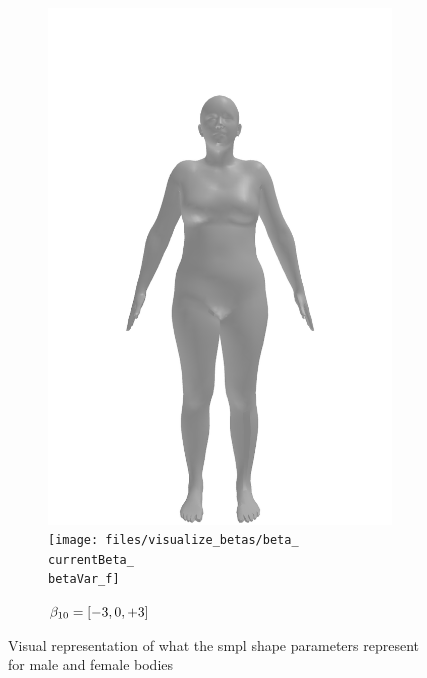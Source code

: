 \begin{figure}[h!]
\begin{subfigure}{\betaWidth}
        \includegraphics[width=\imgWidth]{files/visualize_betas/baseline_f}
        \texttt{[image: files/visualize\_betas/beta\_\\currentBeta\_\\betaVar\_f]}
        \caption{$\beta_{10} = [-3, 0, +3]$}
    \end{subfigure}
    \caption{Visual representation of what the \gls{smpl} shape parameters represent for
        male and female bodies}\label{fig:beta-vis}
\end{figure}